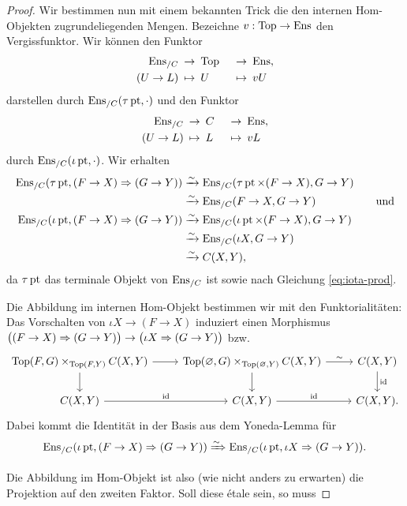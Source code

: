 \begin{proof}
  Wir bestimmen nun mit einem bekannten Trick die den internen
  Hom-Objekten zugrundeliegenden Mengen. Bezeichne $v: \operatorname{Top} \to \operatorname{Ens}$
  den Vergissfunktor. Wir können den Funktor
  \begin{alignat*}{2}
    \operatorname{Ens}_{/C} \: &\to \: \operatorname{Top} \: &&\to \: \operatorname{Ens}, \\
    (U \to L) \: &\mapsto \: U \: &&\mapsto \: vU
  \end{alignat*}
  darstellen durch $\operatorname{Ens}_{/C}(\tau \operatorname{pt}, \cdot)$
  und den Funktor
  \begin{alignat*}{2}
    \operatorname{Ens}_{/C} \: &\to \: C \: &&\to \: \operatorname{Ens}, \\
    (U \to L) \: &\mapsto \: L \: &&\mapsto \: vL
  \end{alignat*}
  durch $\operatorname{Ens}_{/C}(\iota \operatorname{pt}, \cdot)$. Wir erhalten
  \begin{align*}
    \operatorname{Ens}_{/C}(\tau \operatorname{pt}, (F \to X) \Rightarrow (G \to Y))
    &\xrightarrow[]{\sim} \operatorname{Ens}_{/C}(\tau \operatorname{pt} \times (F \to X), G \to Y) \quad & \\
    &\xrightarrow[]{\sim} \operatorname{Ens}_{/C}(F \to X, G \to Y) & \text{und} \\
    \operatorname{Ens}_{/C}(\iota \operatorname{pt}, (F \to X) \Rightarrow (G \to Y))
    &\xrightarrow[]{\sim} \operatorname{Ens}_{/C}(\iota \operatorname{pt} \times (F \to X), G \to Y) \\
    &\xrightarrow[]{\sim} \operatorname{Ens}_{/C}(\iota X, G \to Y) \\
    &\xrightarrow[]{\sim} C(X, Y),
  \end{align*}
  da $\tau \operatorname{pt}$ das terminale Objekt von $\operatorname{Ens}_{/C}$ ist sowie nach
  Gleichung \ref{eq:iota-prod}.

  Die Abbildung im internen Hom-Objekt bestimmen wir mit den
  Funktorialitäten: Das Vorschalten von $\iota X \to (F \to X)$
  induziert einen Morphismus $\big( (F \to X) \Rightarrow (G \to Y) \big)
  \to \big( \iota X \Rightarrow (G \to Y) \big)$ bzw.
  \[ \begin{tikzcd}
    \Top(F, G) \times_{\Top(F, Y)} C(X, Y) \arrow{d} \arrow{r}
    & \Top(\varnothing, G) \times_{\Top(\varnothing, Y)} C(X, Y) \arrow{d} \arrow{r}{\sim}
    & C(X, Y) \arrow{d}{\id} \\
    C(X, Y) \arrow{r}{\id}
    & C(X, Y) \arrow{r}{\id}
    & C(X, Y).
  \end{tikzcd} \]
  Dabei kommt die Identität in der Basis aus dem Yoneda-Lemma für
  \[ \operatorname{Ens}_{/C}(\iota \operatorname{pt}, (F \to X) \Rightarrow (G \to Y))
  \xRightarrow{\sim} \operatorname{Ens}_{/C}(\iota \operatorname{pt}, \iota X \Rightarrow (G \to Y)). \]

  Die Abbildung im Hom-Objekt ist also (wie nicht anders zu erwarten)
  die Projektion auf den zweiten Faktor. Soll diese étale sein, so
  muss %

\end{proof}
  

